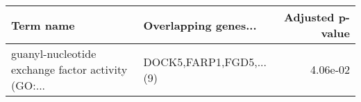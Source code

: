 \begin{tabular}{llr}
\toprule
                                         Term name &    Overlapping genes... &  Adjusted p-value \\
\midrule
guanyl-nucleotide exchange factor activity (GO:... & DOCK5,FARP1,FGD5,...(9) &          4.06e-02 \\
\bottomrule
\end{tabular}
